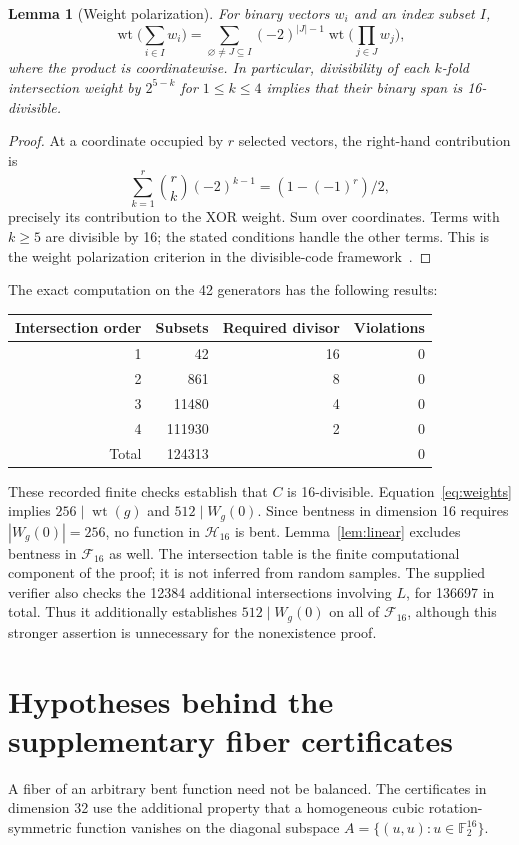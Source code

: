 \documentclass[11pt,a4paper]{article}
\newtheorem{lemma}[theorem]{Lemma}
\newcommand{\F}{\mathbb F_2}
\newcommand{\wt}{\operatorname{wt}}
\begin{document}
\begin{lemma}[Weight polarization]\label{lem:ward}
For binary vectors $w_i$ and an index subset $I$,
\[
 \wt\Big(\sum_{i\in I}w_i\Big)=
 \sum_{\varnothing\ne J\subseteq I}(-2)^{|J|-1}
 \wt\Big(\prod_{j\in J}w_j\Big),
\]
where the product is coordinatewise. In particular, divisibility of each $k$-fold intersection weight by $2^{5-k}$ for $1\le k\le4$ implies that their binary span is 16-divisible.
\end{lemma}
\begin{proof}
At a coordinate occupied by $r$ selected vectors, the right-hand contribution is
\[
\sum_{k=1}^r\binom rk(-2)^{k-1}=(1-(-1)^r)/2,
\]
precisely its contribution to the XOR weight. Sum over coordinates. Terms with $k\ge5$ are divisible by 16; the stated conditions handle the other terms. This is the weight polarization criterion in the divisible-code framework~\cite{ward}.
\end{proof}

The exact computation on the 42 generators has the following results:
\begin{center}
\begin{tabular}{rrrr}
\toprule
Intersection order & Subsets & Required divisor & Violations\\
\midrule
1&42&16&0\\
2&861&8&0\\
3&11480&4&0\\
4&111930&2&0\\
\midrule
Total&124313&&0\\
\bottomrule
\end{tabular}
\end{center}
These recorded finite checks establish that $C$ is 16-divisible. Equation~\ref{eq:weights} implies $256\mid\wt(g)$ and $512\mid W_g(0)$. Since bentness in dimension 16 requires $|W_g(0)|=256$, no function in $\mathcal H_{16}$ is bent. Lemma~\ref{lem:linear} excludes bentness in $\mathcal F_{16}$ as well. The intersection table is the finite computational component of the proof; it is not inferred from random samples. The supplied verifier also checks the 12384 additional intersections involving $L$, for 136697 in total. Thus it additionally establishes $512\mid W_g(0)$ on all of $\mathcal F_{16}$, although this stronger assertion is unnecessary for the nonexistence proof.

\section{Hypotheses behind the supplementary fiber certificates}
A fiber of an arbitrary bent function need not be balanced. The certificates in dimension 32 use the additional property that a homogeneous cubic rotation-symmetric function vanishes on the diagonal subspace $A=\{(u,u):u\in\F^{16}\}$.
\end{document}
